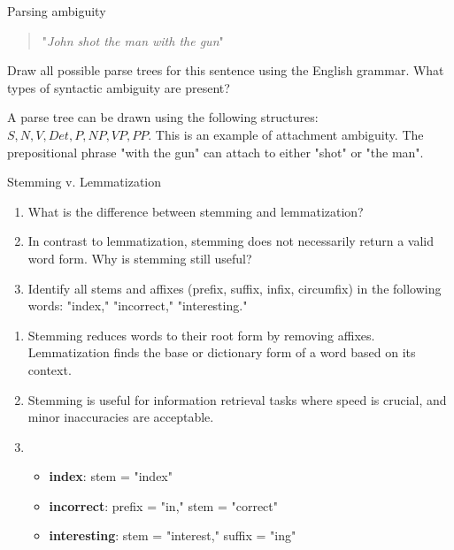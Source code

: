 \documentclass{article}
\begin{document}
\begin{exercise}{Parsing ambiguity}
  \begin{quote}\center "\textit{John shot the man with the gun}"\end{quote}
  Draw all possible parse trees for this sentence using the English grammar. What types of syntactic ambiguity are present?

  \begin{solution}
    A parse tree can be drawn using the following structures: $S, N, V, Det, P, NP, VP, PP$. This is an example of attachment ambiguity. The prepositional phrase "with the gun" can attach to either "shot" or "the man".
  \end{solution}
\end{exercise}

\begin{exercise}{Stemming v. Lemmatization}\label{ex:stem-v-lemm}
  \begin{enumerate}
    \item What is the difference between stemming and lemmatization?
    \item In contrast to lemmatization, stemming does not necessarily return a valid word form. Why is stemming still useful?
    \item Identify all stems and affixes (prefix, suffix, infix, circumfix) in the following words: "index," "incorrect," "interesting."
  \end{enumerate}

  \begin{solution}
    \begin{enumerate}
        \item Stemming reduces words to their root form by removing affixes. Lemmatization finds the base or dictionary form of a word based on its context.
        \item Stemming is useful for information retrieval tasks where speed is crucial, and minor inaccuracies are acceptable.
        \item \begin{itemize}
            \item \textbf{index}: stem = "index"
            \item \textbf{incorrect}: prefix = "in," stem = "correct"
            \item \textbf{interesting}: stem = "interest," suffix = "ing"
        \end{itemize}
    \end{enumerate}
  \end{solution}
\end{exercise}
\end{document}
